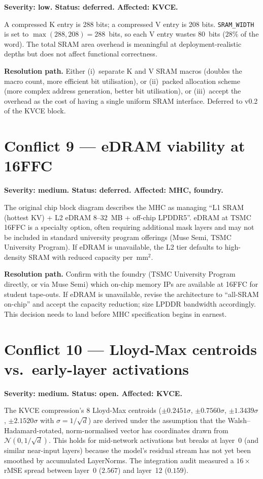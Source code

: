 \documentclass[11pt]{article}
\begin{document}
\textbf{Severity: low. Status: deferred. Affected: KVCE.}

A compressed K entry is 288 bits; a compressed V entry is 208 bits.
\texttt{SRAM\_WIDTH} is set to $\max(288, 208) = 288$~bits, so each
V entry wastes 80~bits ($28\%$ of the word). The total SRAM area
overhead is meaningful at deployment-realistic depths but does not
affect functional correctness.

\textbf{Resolution path.} Either (i)~separate K and V SRAM macros
(doubles the macro count, more efficient bit utilisation), or
(ii)~packed allocation scheme (more complex address generation,
better bit utilisation), or (iii)~accept the overhead as the cost
of having a single uniform SRAM interface. Deferred to v0.2 of the
KVCE block.

\section{Conflict 9 --- eDRAM viability at 16FFC}
\label{sec:c9}

\textbf{Severity: medium. Status: deferred. Affected: MHC, foundry.}

The original chip block diagram describes the MHC as managing
``L1 SRAM (hottest KV) + L2 eDRAM 8--32~MB + off-chip LPDDR5''.
eDRAM at TSMC 16FFC is a specialty option, often requiring
additional mask layers and may not be included in standard university
program offerings (Muse Semi, TSMC University Program). If eDRAM is
unavailable, the L2 tier defaults to high-density SRAM with reduced
capacity per~mm$^2$.

\textbf{Resolution path.} Confirm with the foundry (TSMC University
Program directly, or via Muse Semi) which on-chip memory IPs are
available at 16FFC for student tape-outs. If eDRAM is unavailable,
revise the architecture to ``all-SRAM on-chip'' and accept the
capacity reduction; size LPDDR bandwidth accordingly. This decision
needs to land before MHC specification begins in earnest.

\section{Conflict 10 --- Lloyd-Max centroids vs.\ early-layer activations}
\label{sec:c10}

\textbf{Severity: medium. Status: open. Affected: KVCE.}

The KVCE compression's 8 Lloyd-Max centroids
($\pm 0.2451\sigma$, $\pm 0.7560\sigma$, $\pm 1.3439\sigma$,
$\pm 2.1520\sigma$ with $\sigma = 1/\sqrt{d}$) are derived under the
assumption that the Walsh--Hadamard-rotated, norm-normalised vector
has coordinates drawn from $\mathcal{N}(0, 1/\sqrt{d})$. This holds
for mid-network activations but breaks at layer~0 (and similar
near-input layers) because the model's residual stream has not yet
been smoothed by accumulated LayerNorms. The integration audit
measured a $16\times$ rMSE spread between layer~0 ($2.567$) and
layer~12 ($0.159$).
\end{document}
